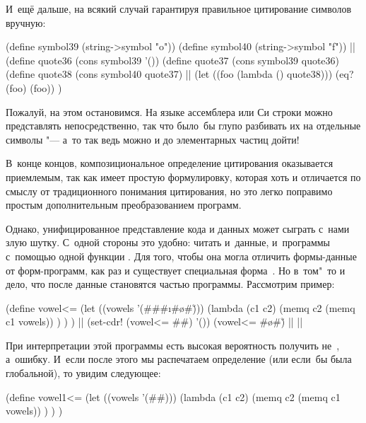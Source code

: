 И~ещё дальше, на всякий случай гарантируя правильное цитирование символов
вручную:

\begin{code:lisp}
(define symbol39 (string->symbol "o"))
(define symbol40 (string->symbol "f"))
||
(define quote36 (cons symbol39 '())
(define quote37 (cons symbol39 quote36)
(define quote38 (cons symbol40 quote37)
||
(let ((foo (lambda () quote38)))
  (eq? (foo) (foo)) )
\end{code:lisp}

Пожалуй, на этом остановимся. На языке ассемблера или Си строки можно
представлять непосредственно, так что было~бы глупо разбивать их на отдельные
символы "--- а~то так ведь можно и до элементарных частиц дойти!

В~конце концов, композициональное определение цитирования оказывается
приемлемым, так как имеет простую формулировку, которая хоть и отличается по
смыслу от традиционного понимания цитирования, но это легко поправимо простым
дополнительным преобразованием программ.

Однако, унифицированное представление кода и данных может сыграть с~нами злую
шутку. С~одной стороны это удобно: читать и~данные, и~программы с~помощью одной
функции . Для того, чтобы она могла отличить формы-данные от
форм-программ, как раз и существует специальная форма~. Но в~том"~то
и дело, что после  данные становятся частью программы. Рассмотрим
пример:


\begin{code:lisp}
(define vowel<=
  (let ((vowels '(#\a #\e #\i #\o #\u)))
    (lambda (c1 c2)
      (memq c2 (memq c1 vowels)) ) ) )
||
(set-cdr! (vowel<= #\a #\e) '())
(vowel<= #\o #\u) |\is| ||
\end{code:lisp}

При интерпретации этой программы есть высокая вероятность получить не~,
а~ошибку. И~если после этого мы распечатаем определение  (или
если~бы  была глобальной), то увидим следующее:

\begin{code:lisp}
(define vowel1<=
  (let ((vowels '(#\a #\e)))
    (lambda (c1 c2)
      (memq c2 (memq c1 vowels)) ) ) )
\end{code:lisp}

